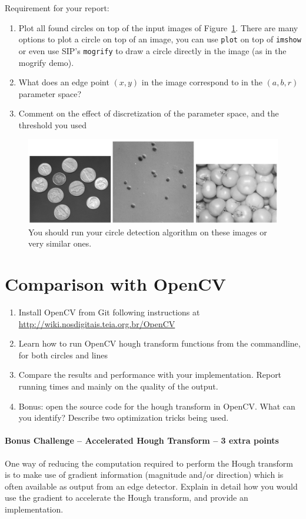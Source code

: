 \documentclass[a4paper]{article}
\begin{document}
Requirement for your report:
\begin{enumerate}
\item Plot all found circles on top of the input images of
Figure~\ref{fig:images:circle:hough}. There are many options to plot a circle on
top of an image, you can use \texttt{plot} on top of \texttt{imshow} or even use
SIP's \texttt{mogrify} to draw a circle directly in the image (as in the mogrify
demo).
\item What does an edge point $(x,y)$ in the image correspond to in the
$(a,b,r)$ parameter space?
\item Comment on the effect of discretization of the parameter space, and the
threshold you used
\end{enumerate}
\begin{figure}
\centering
\includegraphics[width=\linewidth]{figs/images-for-circle-hough.png}%
\caption{%
You should run your circle detection algorithm on these images or very similar ones.
}\label{fig:images:circle:hough}
\end{figure}

\section{Comparison with OpenCV}
\begin{enumerate}
\item Install OpenCV from Git following instructions at \url{http://wiki.nosdigitais.teia.org.br/OpenCV}
\item Learn how to run OpenCV hough transform functions from the commandline,
for both circles and lines
\item Compare the results and performance with your implementation. Report
running times and mainly on the quality of the output.
\item Bonus: open the source code for the hough transform in OpenCV. What can
you identify? Describe two optimization tricks being used.
\end{enumerate}

\paragraph{Bonus Challenge -- Accelerated Hough Transform -- 3 extra points} One way of reducing the
computation required to perform the Hough transform is to make use of gradient
information (magnitude and/or direction) which is often available as output from
an edge detector.  Explain in detail how you would use the gradient to
accelerate the Hough transform, and provide an implementation.





\end{document}
